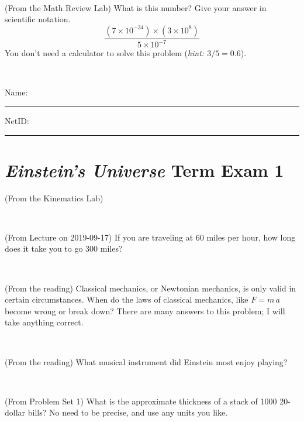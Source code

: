 \documentclass[12pt, letterpaper]{article}
\begin{document}
\vfill ~

\begin{problem} (From the Math Review Lab)
What is this number? Give your answer in scientific notation.
$$
\frac{(7\times10^{-34})\times(3\times10^8)}{5\times10^{-7}}
$$
You don't need a calculator to solve this problem (\textit{hint: $3/5=0.6$}).
\end{problem}


\vfill ~


\cleardoublepage



\noindent
Name: \rule[-1ex]{0.60\textwidth}{0.1pt}
NetID: \rule[-1ex]{0.20\textwidth}{0.1pt}

\section*{\textsl{Einstein's Universe} Term Exam 1}
\setcounter{problem}{1}


\begin{problem} (From the Kinematics Lab)

\end{problem}


\vfill ~

\begin{problem} (From Lecture on 2019-09-17)
If you are traveling at 60 miles per hour, how long does
it take you to go 300 miles?
\end{problem}


\vfill ~

\begin{problem} (From the reading)
Classical mechanics, or Newtonian mechanics, is only valid in certain
circumstances. When do the laws of classical mechanics, like $F =
m\,a$ become wrong or break down? There are many answers to this
problem; I will take anything correct.
\end{problem}


\vfill ~

\begin{problem} (From the reading)
What musical instrument did Einstein most enjoy playing?
\end{problem}


\vfill ~


\clearpage


\begin{problem} (From Problem Set 1)
What is the approximate thickness of a stack of 1000 20-dollar bills?
No need to be precise, and use any units you like.
\end{problem}
\end{document}
